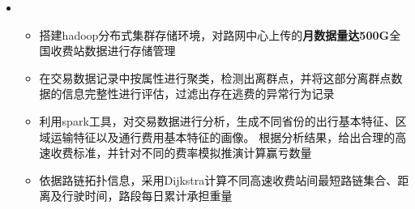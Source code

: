   \begin{itemize}[leftmargin=*]
    \item
      {\small
      \begin{itemize}
        \item 搭建hadoop分布式集群存储环境，对路网中心上传的\textbf{月数据量达500G}全国收费站数据进行存储管理
        \item 在交易数据记录中按属性进行聚类，检测出离群点，并将这部分离群点数据的信息完整性进行评估，过滤出存在逃费的异常行为记录%
        \item 利用spark工具，对交易数据进行分析，生成不同省份的出行基本特征、区域运输特征以及通行费用基本特征的画像。 根据分析结果，给出合理的高速收费标准，并针对不同的费率模拟推演计算赢亏数量
        \item 依据路链拓扑信息，采用Dijkstra计算不同高速收费站间最短路链集合、距离及行驶时间，路段每日累计承担重量
      \end{itemize}
      }

\end{itemize}
